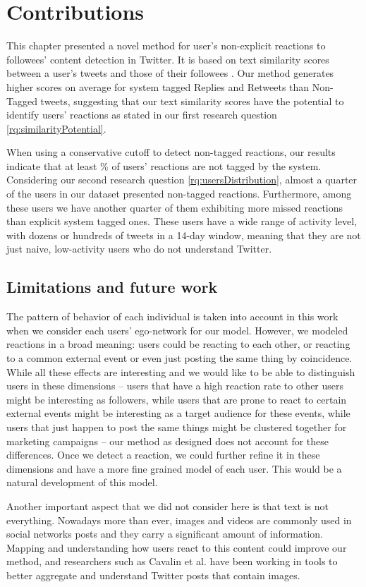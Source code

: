 \color{black}

\section{Contributions}

This chapter presented a novel method for user's non-explicit reactions to followees' content detection in Twitter. It is based on text similarity scores between a user's tweets and those of their followees \cite{Barbosa}.  Our method generates higher scores on average for system tagged Replies and Retweets than Non-Tagged tweets, suggesting that our text similarity scores have the potential to identify users' reactions as stated in our first research question \ref{rq:similarityPotential}.  

When using a conservative cutoff to detect non-tagged reactions, our results indicate that at least \highNonTaggedTweetCountPct{}\% of users' reactions are not tagged by the system.  Considering our second research question \ref{rq:usersDistribution}, almost a quarter of the users in our dataset presented non-tagged reactions. Furthermore, among these users we have another quarter of them exhibiting more missed reactions than explicit system tagged ones. These users have a wide range of activity level, with dozens or hundreds of tweets in a 14-day window, meaning that they are not just naive, low-activity users who do not understand Twitter.

\color{red}
\subsection{Limitations and future work}

The pattern of behavior of each individual is taken into account in this work when we consider each users' ego-network for our model. However, we modeled reactions in a broad meaning: users could be reacting to each other, or reacting to a common external event or even just posting the same thing by coincidence. While all these effects are interesting and we would like to be able to distinguish users in these dimensions -- users that have a high reaction rate to other users might be interesting as followers, while users that are prone to react to certain external events might be interesting as a target audience for these events, while users that just happen to post the same things might be clustered together for marketing campaigns -- our method as designed does not account for these differences. Once we detect a reaction, we could further refine it in these dimensions and have a more fine grained model of each user. This would be a natural development of this model.

Another important aspect that we did not consider here is that text is not everything. Nowadays more than ever, images and videos are commonly used in social networks posts and they carry a significant amount of information. Mapping and understanding how users react to this content could improve our method, and researchers such as Cavalin et al. \cite{Cavalin2016} have been working in tools to better aggregate and understand Twitter posts that contain images.
\color{black}

